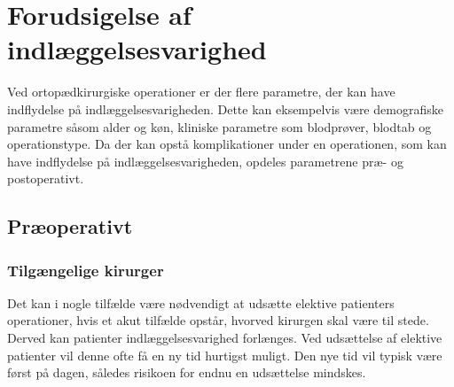 \section{Forudsigelse af indlæggelsesvarighed}
Ved ortopædkirurgiske operationer er der flere parametre, der kan have indflydelse på indlæggelsesvarigheden. Dette kan eksempelvis være demografiske parametre såsom alder og køn, kliniske parametre som blodprøver, blodtab og operationstype. Da der kan opstå komplikationer under en operationen, som kan have indflydelse på indlæggelsesvarigheden, opdeles parametrene præ- og postoperativt.

\subsection{Præoperativt}



\subsubsection{Tilgængelige kirurger}
Det kan i nogle tilfælde være nødvendigt at udsætte elektive patienters operationer, hvis et akut tilfælde opstår, hvorved kirurgen skal være til stede. Derved kan patienter indlæggelsesvarighed forlænges. Ved udsættelse af elektive patienter vil denne ofte få en ny tid hurtigst muligt. Den nye tid vil typisk være først på dagen, således risikoen for endnu en udsættelse mindskes.
